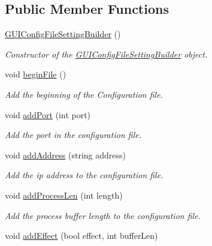 \subsection*{Public Member Functions}
\begin{DoxyCompactItemize}
\item 
\mbox{\hyperlink{class_g_u_i_config_file_setting_builder_a336f849026dd51c1d5baad427bf88b2f}{G\+U\+I\+Config\+File\+Setting\+Builder}} ()
\begin{DoxyCompactList}\small\item\em Constructor of the \mbox{\hyperlink{class_g_u_i_config_file_setting_builder}{G\+U\+I\+Config\+File\+Setting\+Builder}} object. \end{DoxyCompactList}\item 
\mbox{\label{class_g_u_i_config_file_setting_builder_abb34e9977749af9414369f10fe2c455c}} 
void \mbox{\hyperlink{class_g_u_i_config_file_setting_builder_abb34e9977749af9414369f10fe2c455c}{begin\+File}} ()
\begin{DoxyCompactList}\small\item\em Add the beginning of the Configuration file. \end{DoxyCompactList}\item 
void \mbox{\hyperlink{class_g_u_i_config_file_setting_builder_aadf2b48c000de4e7dc8d060d486a81b7}{add\+Port}} (int port)
\begin{DoxyCompactList}\small\item\em Add the port in the configuration file. \end{DoxyCompactList}\item 
void \mbox{\hyperlink{class_g_u_i_config_file_setting_builder_abbaa15d81d247c3bca68a03e31b78e3e}{add\+Address}} (string address)
\begin{DoxyCompactList}\small\item\em Add the ip address to the configuration file. \end{DoxyCompactList}\item 
void \mbox{\hyperlink{class_g_u_i_config_file_setting_builder_a889dd395439312fa995862319327e425}{add\+Process\+Len}} (int length)
\begin{DoxyCompactList}\small\item\em Add the process buffer length to the configuration file. \end{DoxyCompactList}\item 
void \mbox{\hyperlink{class_g_u_i_config_file_setting_builder_ac7f7238c200dc4000951b24ead586847}{add\+Effect}} (bool effect, int buffer\+Len)

\end{DoxyCompactItemize}

